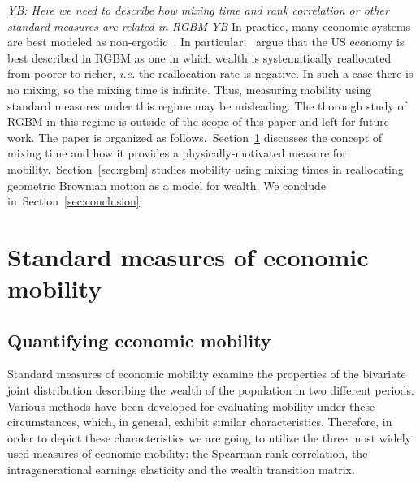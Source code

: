 \documentclass[11pt]{article}
\newcommand{\blue}[1]{{\color{blue} #1}}
\newcommand{\Sref}[1]{Section~\ref{sec:#1}}
\newcommand{\ie}{{\it i.e.}\xspace}
\newcommand{\YB}[1]{\blue{{\it YB: #1 YB}}}
\numberwithin{equation}{section}
\begin{document}
\YB{Here we need to describe how mixing time and rank correlation or other standard measures are related in RGBM}
In practice, many economic systems are best modeled as non-ergodic~\citep{Peters2019b}. In particular,~\citet{BermanPetersAdamou2019} argue that the US economy is best described in RGBM as one in which wealth is systematically reallocated from poorer to richer, \ie the reallocation rate is negative. In such a case there is no mixing, so the mixing time is infinite. Thus, measuring mobility using standard measures under this regime may be misleading. The thorough study of RGBM in this regime is outside of the scope of this paper and left for future work.
The paper is organized as follows.~\Sref{mixingtime} discusses the concept of mixing time and how it provides a physically-motivated measure for mobility.~\Sref{rgbm} studies mobility using mixing times in reallocating geometric Brownian motion as a model for wealth. We conclude in~\Sref{conclusion}.

\section{Standard measures of economic mobility}\label{sec:mixingtime}

\subsection{Quantifying economic mobility}


Standard measures of economic mobility examine the properties of the bivariate joint distribution describing the wealth of the population in two different periods. Various methods have been developed for evaluating mobility under these circumstances, which, in general, exhibit similar characteristics. Therefore, in order to depict these characteristics we are going to utilize the three most widely used measures of economic mobility: the Spearman rank correlation, the intragenerational earnings elasticity and the wealth transition matrix. 
\end{document}

